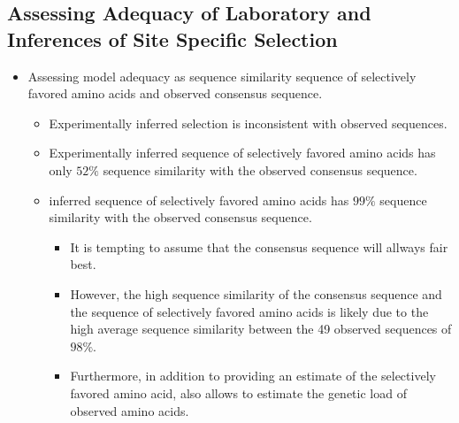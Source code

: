 \documentclass[12pt]{article}
\begin{document}
\subsection*{Assessing Adequacy of Laboratory and \selac Inferences of Site Specific Selection}
\begin{itemize}
	\item Assessing model adequacy as sequence similarity sequence of selectively favored amino acids and observed consensus sequence.
	\begin{itemize}
		\item Experimentally inferred selection is inconsistent with observed sequences.
		\item Experimentally inferred sequence of selectively favored amino acids has only $52 \%$ sequence similarity with the observed consensus sequence.
		\item \selac inferred sequence of selectively favored amino acids has $99 \%$ sequence similarity with the observed consensus sequence.
		\begin{itemize}
			\item It is tempting to assume that the consensus sequence will allways fair best.
			\item However, the high sequence similarity of the consensus sequence and the sequence of selectively favored amino acids is likely due to the high average sequence similarity between the 49 observed sequences of $98 \%$.
			\item Furthermore, in addition to providing an estimate of the selectively favored amino acid, \selac also allows to estimate the genetic load of observed amino acids.
		\end{itemize}
	\end{itemize}
\end{itemize}
\end{document}
